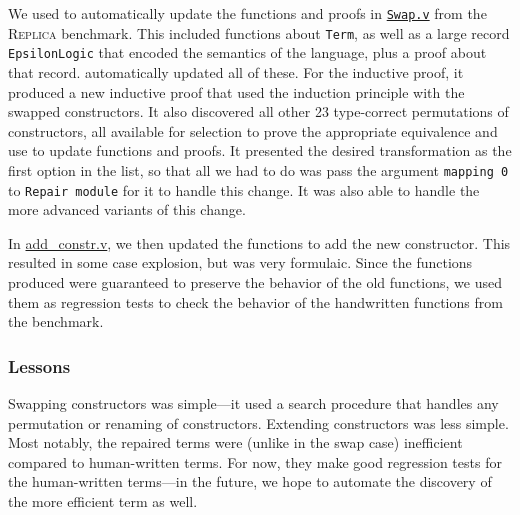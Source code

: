 We used \toolname to automatically update the functions and proofs in \href{https://github.com/uwplse/pumpkin-pi/blob/v2.0.0/plugin/coq/Swap.v}{\lstinline{Swap.v}} from the \textsc{Replica} benchmark.
This included functions about \lstinline{Term}, as well as a large record \lstinline{EpsilonLogic} that encoded the semantics of the language,
plus a proof about that record.
\toolname automatically updated all of these. For the inductive proof, it produced
a new inductive proof that used the induction principle with the swapped constructors.
It also discovered all other 23 type-correct permutations of constructors, all available for selection to 
prove the appropriate equivalence and use to update functions and proofs.
It presented the desired transformation as the first option in the list, so that all we had to do
was pass the argument \lstinline{mapping 0} to \lstinline{Repair module} for it to handle this change.
It was also able to handle the more advanced variants of this change.

In \href{https://github.com/uwplse/pumpkin-pi/blob/v2.0.0/plugin/coq/playground/add_constr.v}{add_constr.v},
we then updated the functions to add the new constructor.
This resulted in some case explosion, but was very formulaic.
Since the functions \toolname produced were guaranteed to preserve the behavior of the old functions,
we used them as regression tests to check the behavior of the handwritten functions from the benchmark.

\subsubsection{Lessons}

Swapping constructors was simple---it used a search procedure that handles
any permutation or renaming of constructors.
Extending constructors was less simple.
Most notably, the repaired terms were (unlike in the swap case) inefficient compared to human-written terms.
For now, they make good regression tests for the human-written terms---in the future,
we hope to automate the discovery of the more efficient term as well.

